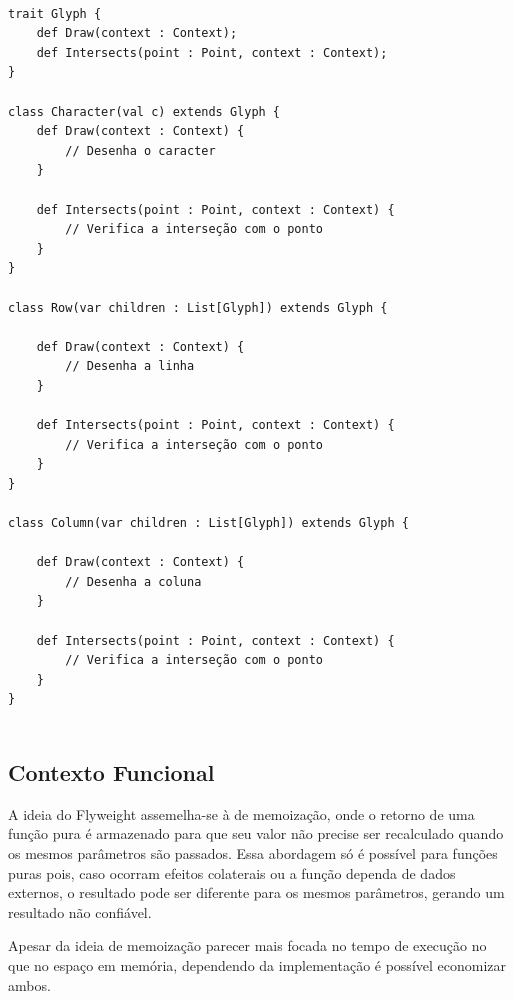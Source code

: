 \begin{lstlisting}[caption={Flyweight Orientado a Objetos},label=ooflyweight]

trait Glyph {
	def Draw(context : Context);
	def Intersects(point : Point, context : Context);
}

class Character(val c) extends Glyph {
	def Draw(context : Context) {
		// Desenha o caracter
	}

	def Intersects(point : Point, context : Context) {
		// Verifica a interseção com o ponto
	}
}

class Row(var children : List[Glyph]) extends Glyph {

	def Draw(context : Context) {
		// Desenha a linha
	}

	def Intersects(point : Point, context : Context) {
		// Verifica a interseção com o ponto
	}
}

class Column(var children : List[Glyph]) extends Glyph {

	def Draw(context : Context) {
		// Desenha a coluna
	}

	def Intersects(point : Point, context : Context) {
		// Verifica a interseção com o ponto
	}
}


\end{lstlisting}

\subsection*{Contexto Funcional}

A ideia do Flyweight assemelha-se à de memoização, onde o 
retorno de uma função pura é armazenado para que seu valor 
não precise ser recalculado quando os mesmos parâmetros 
são passados. Essa abordagem só é possível para funções 
puras pois, caso ocorram efeitos colaterais ou a função 
dependa de dados externos, o resultado pode ser diferente 
para os mesmos parâmetros, gerando um resultado não 
confiável.

Apesar da ideia de memoização parecer mais focada no tempo 
de execução no que no espaço em memória, dependendo da 
implementação é possível economizar ambos.

\begin{lstlisting}[caption={Flyweight Funcional},label=fpflyweight]
    

    
\end{lstlisting}